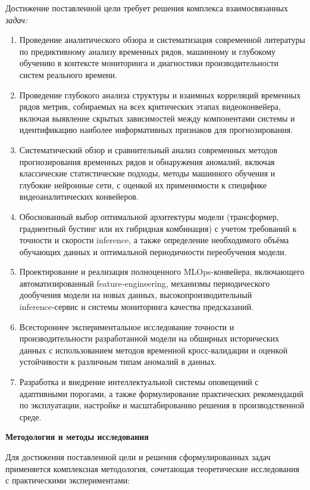 \hspace*{1.25cm}Достижение поставленной цели требует решения комплекса взаимосвязанных \textit{задач:}

\begin{enumerate}
	\item Проведение аналитического обзора и систематизация современной литературы по предиктивному анализу временных рядов, машинному и глубокому обучению в контексте мониторинга и диагностики производительности систем реального времени.
	\item Проведение глубокого анализа структуры и взаимных корреляций временных рядов метрик, собираемых на всех критических этапах видеоконвейера, включая выявление скрытых зависимостей между компонентами системы и идентификацию наиболее информативных признаков для прогнозирования.
	\item Систематический обзор и сравнительный анализ современных методов прогнозирования временных рядов и обнаружения аномалий, включая классические статистические подходы, методы машинного обучения и глубокие нейронные сети, с оценкой их применимости к специфике видеоаналитических конвейеров.
	\item Обоснованный выбор оптимальной архитектуры модели (трансформер, градиентный бустинг или их гибридная комбинация) с учетом требований к точности и скорости inference, а также определение необходимого объёма обучающих данных и оптимальной периодичности переобучения модели.
	\item Проектирование и реализация полноценного MLOps-конвейера, включающего автоматизированный feature‑engineering, механизмы периодического дообучения модели на новых данных, высокопроизводительный inference‑сервис и системы мониторинга качества предсказаний.
	\item Всестороннее экспериментальное исследование точности и производительности разработанной модели на обширных исторических данных с использованием методов временной кросс-валидации и оценкой устойчивости к различным типам аномалий в данных.
	\item Разработка и внедрение интеллектуальной системы оповещений с адаптивными порогами, а также формулирование практических рекомендаций по эксплуатации, настройке и масштабированию решения в производственной среде.
\end{enumerate}

\textbf{Методология и методы исследования}

\hspace*{1.25cm}Для достижения поставленной цели и решения сформулированных задач применяется комплексная методология, сочетающая теоретические исследования с практическими экспериментами:

